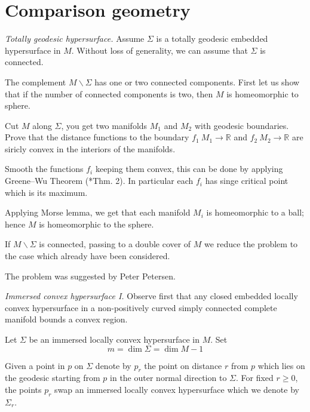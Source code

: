 \section*{Comparison geometry}



\textit{Totally geodesic hypersurface.}
Assume $\Sigma$ is a totally geodesic embedded hypersurface in $M$.
Without loss of generality, we can assume that $\Sigma$ is connected.

The complement $M\backslash\Sigma$ has one or two connected components.
First let us show that if the number of connected components is two, then $M$ is homeomorphic to sphere.

Cut $M$ along $\Sigma$,
you get two manifolds $M_1$ and $M_2$
with geodesic boundaries. 
Prove that the distance functions to the boundary 
$f_1\:M_1\to\mathbb{R}$ and $f_2\:M_2\to\mathbb{R}$ are siricly convex in the interiors of the manifolds.

Smooth the functions $f_i$ keeping them convex, this can be done by applying Greene--Wu Theorem (\cite{greene-wu}*{Thm. 2}).
In particular each $f_i$ has singe critical point which is its maximum.

Applying Morse lemma, we get that each manifold $M_i$ is homeomorphic to a ball; 
hence $M$ 
is homeomorphic to the sphere.

If $M\backslash\Sigma$ is connected,
passing to a double cover of $M$ 
we reduce the problem to the case which already have been considered.

The problem was suggested by Peter Petersen.



\textit{Immersed convex hypersurface {\rm I}.}
Observe first that any closed embedded locally convex hypersurface in a non-positively curved simply connected complete manifold bounds a convex region.


Let $\Sigma$ be an immersed locally convex hypersurface in $M$.
Set 
\[m=\dim \Sigma=\dim M-1\]

Given a point in $p$ on $\Sigma$ 
denote by $p_r$ the point on distance $r$ from $p$
which lies on the geodesic starting from $p$ in the outer normal direction to $\Sigma$.
For fixed $r\ge 0$,
the points $p_r$ swap an immersed locally convex hypersurface which we denote by $\Sigma_r$.

